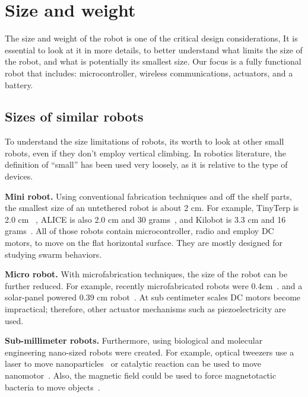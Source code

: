 
\chapter{Size and weight}
The size and weight of the robot is one of the critical design considerations, It is essential to look at it in more details, to better understand what limits the size of the robot, and what is potentially its smallest size. Our focus is a fully functional robot that includes: microcontroller, wireless communications, actuators, and a battery. 

\section{Sizes of similar robots}
To understand the size limitations of robots, its worth to look at other small robots, even if they don’t employ vertical climbing. In robotics literature, the definition of “small” has been used very loosely, as it is relative to the type of devices. %

\textbf{Mini robot.}
Using conventional fabrication techniques and off the shelf parts, the smallest size of an untethered robot is about 2 cm. For example, TinyTerp is 2.0 cm~\cite{sabelhaus2013tinyterp} , ALICE is also 2.0 cm and 30 grams~\cite{caprari2001fascination}, and Kilobot is 3.3 cm and 16 grams~\cite{rubenstein2012kilobot}. All of those robots contain microcontroller, radio and employ DC motors, to move on the flat horizontal surface. They are mostly designed for studying swarm behaviors. 

\textbf{Micro robot.}
With microfabrication techniques, the size of the robot can be further reduced. For example, recently microfabricated robots were 0.4cm~\cite{iwata2016insect}.  and a solar-panel powered 0.39 cm robot~\cite{edqvist2009evaluation}. At sub centimeter scales DC motors become impractical; therefore, other actuator mechanisms such as piezoelectricity are used.

\textbf{Sub-millimeter robots.}
Furthermore, using biological and molecular engineering nano-sized robots were created. For example, optical tweezers use a laser to move nanoparticles~\cite{curtis2002dynamic} or catalytic reaction can be used to move nanomotor~\cite{paxton2004catalytic}. Also, the magnetic field could be used to force magnetotactic bacteria to move objects~\cite{martel2006controlled}.

